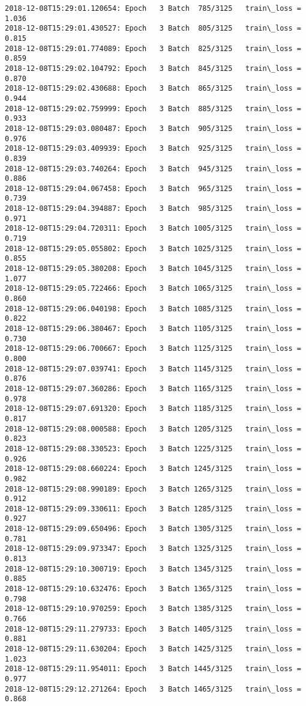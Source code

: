 \documentclass[11pt]{article}
\begin{document}
\begin{Verbatim}[commandchars=\\\{\}]
2018-12-08T15:29:01.120654: Epoch   3 Batch  785/3125   train\_loss = 1.036
2018-12-08T15:29:01.430527: Epoch   3 Batch  805/3125   train\_loss = 0.815
2018-12-08T15:29:01.774089: Epoch   3 Batch  825/3125   train\_loss = 0.859
2018-12-08T15:29:02.104792: Epoch   3 Batch  845/3125   train\_loss = 0.870
2018-12-08T15:29:02.430688: Epoch   3 Batch  865/3125   train\_loss = 0.944
2018-12-08T15:29:02.759999: Epoch   3 Batch  885/3125   train\_loss = 0.933
2018-12-08T15:29:03.080487: Epoch   3 Batch  905/3125   train\_loss = 0.976
2018-12-08T15:29:03.409939: Epoch   3 Batch  925/3125   train\_loss = 0.839
2018-12-08T15:29:03.740264: Epoch   3 Batch  945/3125   train\_loss = 0.886
2018-12-08T15:29:04.067458: Epoch   3 Batch  965/3125   train\_loss = 0.739
2018-12-08T15:29:04.394887: Epoch   3 Batch  985/3125   train\_loss = 0.971
2018-12-08T15:29:04.720311: Epoch   3 Batch 1005/3125   train\_loss = 0.719
2018-12-08T15:29:05.055802: Epoch   3 Batch 1025/3125   train\_loss = 0.855
2018-12-08T15:29:05.380208: Epoch   3 Batch 1045/3125   train\_loss = 1.077
2018-12-08T15:29:05.722466: Epoch   3 Batch 1065/3125   train\_loss = 0.860
2018-12-08T15:29:06.040198: Epoch   3 Batch 1085/3125   train\_loss = 0.822
2018-12-08T15:29:06.380467: Epoch   3 Batch 1105/3125   train\_loss = 0.730
2018-12-08T15:29:06.700667: Epoch   3 Batch 1125/3125   train\_loss = 0.800
2018-12-08T15:29:07.039741: Epoch   3 Batch 1145/3125   train\_loss = 0.876
2018-12-08T15:29:07.360286: Epoch   3 Batch 1165/3125   train\_loss = 0.978
2018-12-08T15:29:07.691320: Epoch   3 Batch 1185/3125   train\_loss = 0.817
2018-12-08T15:29:08.000588: Epoch   3 Batch 1205/3125   train\_loss = 0.823
2018-12-08T15:29:08.330523: Epoch   3 Batch 1225/3125   train\_loss = 0.926
2018-12-08T15:29:08.660224: Epoch   3 Batch 1245/3125   train\_loss = 0.982
2018-12-08T15:29:08.990189: Epoch   3 Batch 1265/3125   train\_loss = 0.912
2018-12-08T15:29:09.330611: Epoch   3 Batch 1285/3125   train\_loss = 0.927
2018-12-08T15:29:09.650496: Epoch   3 Batch 1305/3125   train\_loss = 0.781
2018-12-08T15:29:09.973347: Epoch   3 Batch 1325/3125   train\_loss = 0.813
2018-12-08T15:29:10.300719: Epoch   3 Batch 1345/3125   train\_loss = 0.885
2018-12-08T15:29:10.632476: Epoch   3 Batch 1365/3125   train\_loss = 0.798
2018-12-08T15:29:10.970259: Epoch   3 Batch 1385/3125   train\_loss = 0.766
2018-12-08T15:29:11.279733: Epoch   3 Batch 1405/3125   train\_loss = 0.881
2018-12-08T15:29:11.630204: Epoch   3 Batch 1425/3125   train\_loss = 1.023
2018-12-08T15:29:11.954011: Epoch   3 Batch 1445/3125   train\_loss = 0.977
2018-12-08T15:29:12.271264: Epoch   3 Batch 1465/3125   train\_loss = 0.868

\end{Verbatim}
\end{document}
